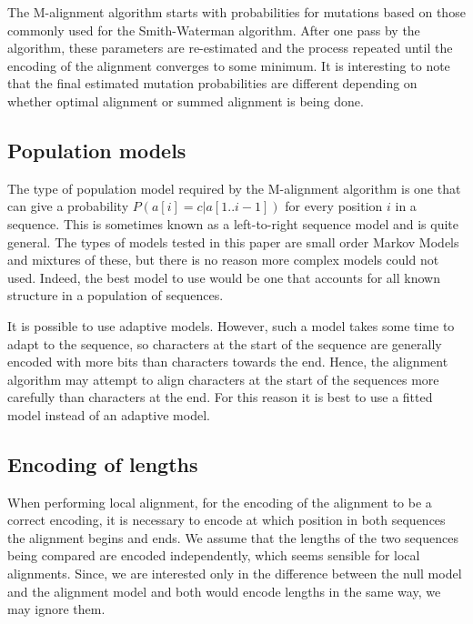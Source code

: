 \documentclass[letterpaper,11pt,oneside]{article}
\begin{document}
The M-alignment algorithm starts with probabilities for mutations based on
those commonly used for the Smith-Waterman algorithm.  After one pass by the
algorithm, these parameters are re-estimated and the process repeated until
the encoding of the alignment converges to some minimum.  It is interesting to
note that the final estimated mutation probabilities are different depending
on whether optimal alignment or summed alignment is being done.


\subsection{Population models}

The type of population model required by the M-alignment algorithm is one that
can give a probability $P(a[i]=c|a[1..i-1])$ for every position $i$ in a
sequence.  This is sometimes known as a left-to-right sequence model and is
quite general.  The types of models tested in this paper are small order
Markov Models and mixtures of these, but there is no reason more complex models
could not used.  Indeed, the best model to use would be one that accounts for
all known structure in a population of sequences.

It is possible to use adaptive models.  However, such a model takes some time
to adapt to the sequence, so characters at the start of the sequence are
generally encoded with more bits than characters towards the end.  Hence, the
alignment algorithm may attempt to align characters at the start of the
sequences more carefully than characters at the end.  For this reason it is
best to use a fitted model instead of an adaptive model.

\subsection{Encoding of lengths}

When performing local alignment, for the encoding of the alignment to be a
correct encoding, it is necessary to encode at which position in both
sequences the alignment begins and ends.  We assume that the lengths of the
two sequences being compared are encoded independently, which seems sensible
for local alignments.  Since, we are interested only in the difference between
the null model and the alignment model and both would encode lengths in the
same way, we may ignore them.
\end{document}
